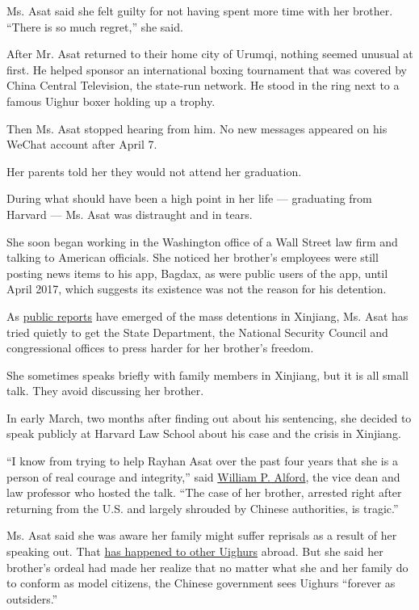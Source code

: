 Ms. Asat said she felt guilty for not having spent more time with her
brother. ``There is so much regret,'' she said.

After Mr. Asat returned to their home city of Urumqi, nothing seemed
unusual at first. He helped sponsor an international boxing tournament
that was covered by China Central Television, the state-run network. He
stood in the ring next to a famous Uighur boxer holding up a trophy.

Then Ms. Asat stopped hearing from him. No new messages appeared on his
WeChat account after April 7.

Her parents told her they would not attend her graduation.

During what should have been a high point in her life --- graduating
from Harvard --- Ms. Asat was distraught and in tears.

She soon began working in the Washington office of a Wall Street law
firm and talking to American officials. She noticed her brother's
employees were still posting news items to his app, Bagdax, as were
public users of the app, until April 2017, which suggests its existence
was not the reason for his detention.

As
\href{https://www.nytimes.com/2019/12/07/world/europe/uighur-whistleblower.html}{public
reports} have emerged of the mass detentions in Xinjiang, Ms. Asat has
tried quietly to get the State Department, the National Security Council
and congressional offices to press harder for her brother's freedom.

She sometimes speaks briefly with family members in Xinjiang, but it is
all small talk. They avoid discussing her brother.

In early March, two months after finding out about his sentencing, she
decided to speak publicly at Harvard Law School about his case and the
crisis in Xinjiang.

``I know from trying to help Rayhan Asat over the past four years that
she is a person of real courage and integrity,'' said
\href{https://hls.harvard.edu/faculty/directory/10010/Alford}{William P.
Alford}, the vice dean and law professor who hosted the talk. ``The case
of her brother, arrested right after returning from the U.S. and largely
shrouded by Chinese authorities, is tragic.''

Ms. Asat said she was aware her family might suffer reprisals as a
result of her speaking out. That
\href{https://www.nytimes.com/2018/10/18/world/asia/uighur-muslims-china-detainment.html}{has
happened to other Uighurs} abroad. But she said her brother's ordeal had
made her realize that no matter what she and her family do to conform as
model citizens, the Chinese government sees Uighurs ``forever as
outsiders.''

